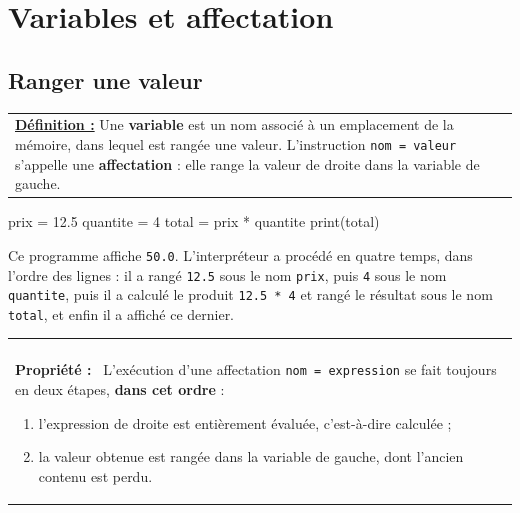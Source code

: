 \documentclass[a4paper,11pt,openany]{book}
\makeatletter
\newcommand{\mot}[1]{\textcolor{rougecours}{\textbf{#1}}}
\newcommand{\code}[1]{\texttt{\textcolor{codebleu}{#1}}}
\newenvironment{cadre}%
 {\par\vspace{2mm}\noindent\begin{tabular}{|@{\hspace{4mm}}p{0.93\textwidth}@{\hspace{4mm}}|}
  \hline \\[-2mm]}%
 {\\[2mm] \hline \end{tabular}\par\vspace{3mm}}
\newcommand{\propo}[1]{\textbf{Propriété #1 :}~}
\makeatother
\begin{document}
\section{Variables et affectation}

\subsection{Ranger une valeur}

\begin{center}
\begin{tabularx}{15cm}{||X}
\noindent \textbf{\underline{Définition :}} Une \mot{variable} est un nom associé à un emplacement de la mémoire, dans lequel est rangée une valeur. L'instruction \code{nom = valeur} s'appelle une \mot{affectation} : elle range la valeur de droite dans la variable de gauche.
\end{tabularx}
\end{center}

\begin{python}
prix = 12.5
quantite = 4
total = prix * quantite
print(total)
\end{python}

Ce programme affiche \code{50.0}. L'interpréteur a procédé en quatre temps, dans l'ordre des lignes : il a rangé \code{12.5} sous le nom \code{prix}, puis \code{4} sous le nom \code{quantite}, puis il a calculé le produit \code{12.5 * 4} et rangé le résultat sous le nom \code{total}, et enfin il a affiché ce dernier.

\begin{cadre}
\propo{} L'exécution d'une affectation \code{nom = expression} se fait toujours en deux étapes, \textbf{dans cet ordre} :
\begin{enumerate}[leftmargin=8mm,itemsep=0.5mm,topsep=1mm]
\item l'expression de droite est entièrement évaluée, c'est-à-dire calculée ;
\item la valeur obtenue est rangée dans la variable de gauche, dont l'ancien contenu est perdu.
\end{enumerate}
\end{cadre}
\end{document}
